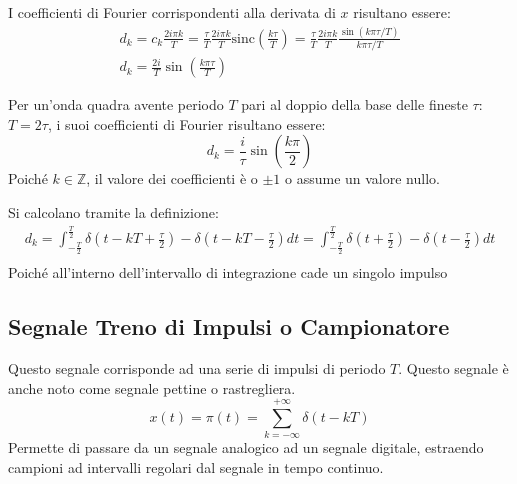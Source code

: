 \documentclass{article}
\numberwithin{equation}{subsection}
\begin{document}
I coefficienti di Fourier corrispondenti alla derivata di $x$ risultano essere:
\begin{gather*}
    d_k=c_k\displaystyle\frac{2i\pi k}{T}=\frac{\tau}{T}\frac{2i\pi k}{T}\mbox{sinc}\left({\frac{k\tau}{T}}\right)=\frac{\tau}{T}\frac{2i\pi k}{T}\frac{\sin(k\pi \tau/T)}{k\pi \tau/T}\\
    d_k=\displaystyle\frac{2i}{T}\sin\left(\frac{k\pi\tau}{T}\right)
\end{gather*}

Per un'onda quadra avente periodo $T$ pari al doppio della base delle fineste $\tau$: $T=2\tau$, i suoi coefficienti di Fourier risultano essere:
\begin{equation*}
    d_k=\displaystyle\frac{i}{\tau}\sin\left(\frac{k\pi}{2}\right)
\end{equation*}
Poiché $k\in\mathbb{Z}$, il valore dei coefficienti è o $\pm1$ o assume un valore nullo. 

Si calcolano tramite la definizione:
\begin{gather*}
    d_k=\displaystyle\int_{-\frac{T}{2}}^{\frac{T}{2}}\delta\left(t-kT+\frac{\tau}{2}\right)-\delta\left(t-kT-\frac{\tau}{2}\right)dt=
    \int_{-\frac{T}{2}}^{\frac{T}{2}}\delta\left(t+\frac{\tau}{2}\right)-\delta\left(t-\frac{\tau}{2}\right)dt\\
\end{gather*}
Poiché all'interno dell'intervallo di integrazione cade un singolo impulso

\subsection{Segnale Treno di Impulsi o Campionatore}

Questo segnale corrisponde ad una serie di impulsi di periodo $T$. Questo segnale è anche noto come segnale pettine o rastregliera.  
\begin{equation*}
    x(t)=\pi(t)=\displaystyle\sum_{k=-\infty}^{+\infty}\delta(t-kT)
\end{equation*}
Permette di passare da un segnale analogico ad un segnale digitale, estraendo campioni ad intervalli regolari dal segnale in tempo continuo. 

\begin{center}
\end{center}
\end{document}
